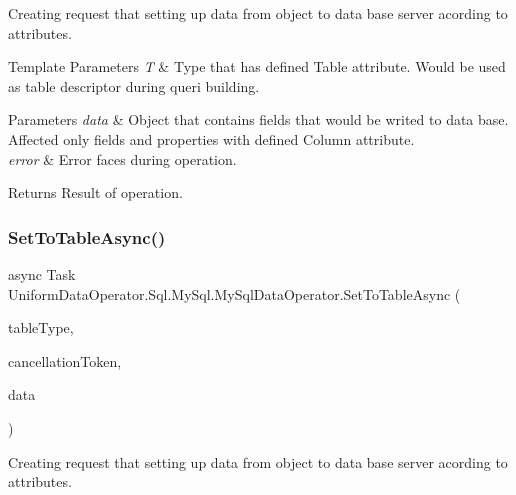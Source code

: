 Creating request that setting up data from object to data base server acording to attributes. 


\begin{DoxyTemplParams}{Template Parameters}
{\em T} & Type that has defined Table attribute. Would be used as table descriptor during queri building.\\
\hline
\end{DoxyTemplParams}

\begin{DoxyParams}{Parameters}
{\em data} & Object that contain\textquotesingle{}s fields that would be writed to data base. Affected only fields and properties with defined Column attribute.\\
\hline
{\em error} & Error faces during operation.\\
\hline
\end{DoxyParams}
\begin{DoxyReturn}{Returns}
Result of operation.
\end{DoxyReturn}
\mbox{\label{class_uniform_data_operator_1_1_sql_1_1_my_sql_1_1_my_sql_data_operator_a036b234868363f2f680e5157ee459439}} 
\subsubsection{\texorpdfstring{Set\+To\+Table\+Async()}{SetToTableAsync()}}
{\footnotesize\ttfamily async Task Uniform\+Data\+Operator.\+Sql.\+My\+Sql.\+My\+Sql\+Data\+Operator.\+Set\+To\+Table\+Async (\begin{DoxyParamCaption}\item[{Type}]{table\+Type,  }\item[{Cancellation\+Token}]{cancellation\+Token,  }\item[{object}]{data }\end{DoxyParamCaption})}



Creating request that setting up data from object to data base server acording to attributes. 


